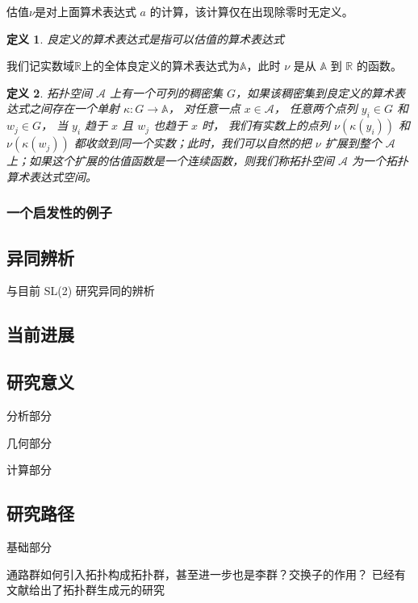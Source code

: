 \documentclass[a4paper,12pt]{article}
\numberwithin{problem}{section}
\newtheorem{definition}{定义}
\numberwithin{definition}{section}
\numberwithin{lemma}{section}
\numberwithin{proposition}{section}
\numberwithin{theorem}{section}
\numberwithin{grammar}{section}
\numberwithin{program}{section}
\numberwithin{convention}{section}
\numberwithin{corollary}{section}
\begin{document}
估值$\nu$是对上面算术表达式 $a$ 的计算，该计算仅在出现除零时无定义。

\begin{definition}
    良定义的算术表达式是指可以估值的算术表达式
\end{definition}

我们记实数域$\mathbb{R}$上的全体良定义的算术表达式为$\mathbb{A}$，此时 $\nu$ 是从 $\mathbb{A}$ 到 $\mathbb{R}$ 的函数。

\begin{definition}
    拓扑空间 $\mathcal{A}$ 上有一个可列的稠密集 $G$，如果该稠密集到良定义的算术表达式之间存在一个单射 $\kappa: G \to \mathbb{A}$，
    对任意一点 $x \in \mathcal{A}$， 任意两个点列 $y_i \in G$ 和 $w_j \in G$， 当 $y_i$ 趋于 $x$ 且 $w_j$ 也趋于 $x$ 时，
    我们有实数上的点列 $\nu(\kappa(y_i))$ 和 $\nu(\kappa(w_j))$ 都收敛到同一个实数；此时，我们可以自然的把 $\nu$ 扩展到整个
    $\mathcal{A}$ 上；如果这个扩展的估值函数是一个连续函数，则我们称拓扑空间 $\mathcal{A}$ 为一个拓扑算术表达式空间。
\end{definition}

\subsubsection{一个启发性的例子}




\subsection{异同辨析}

与目前 SL(2) 研究异同的辨析

\subsection{当前进展}

\subsection{研究意义}

分析部分

几何部分

计算部分

\subsection{研究路径}

基础部分

通路群如何引入拓扑构成拓扑群，甚至进一步也是李群？交换子的作用？
已经有文献给出了拓扑群生成元的研究
\end{document}
